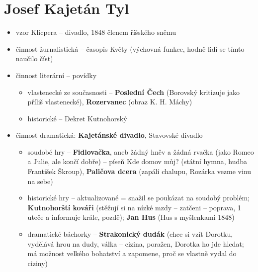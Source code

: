 \documentclass{article}
\begin{document}
\section{Josef Kajetán Tyl}
\begin{itemize}
  \item vzor Klicpera -- divadlo, 1848 členem říšského sněmu
  \item činnost žurnalistická -- časopis Květy (výchovná funkce, hodně lidí se tímto naučilo číst)
  \item činnost literární -- povídky
  \begin{itemize}
    \item vlastenecké ze současnosti -- \textbf{Poslední Čech} (Borovský kritizuje jako příliš vlastenecké), \textbf{Rozervanec} (obraz K. H. Máchy)
    \item historické -- Dekret Kutnohorský
  \end{itemize}
  \item činnost dramatická: \textbf{Kajetánské divadlo}, Stavovské divadlo
  \begin{itemize}
    \item soudobé hry -- \textbf{Fidlovačka}, aneb žádný hněv a žádná rvačka (jako Romeo a Julie, ale končí dobře) -- píseň Kde domov můj? (státní hymna, hudba František Škroup), \textbf{Paličova dcera} (zapálí chalupu, Rozárka vezme vinu na sebe)
    \item historické hry -- aktualizované = snažil se poukázat na soudobý problém; \textbf{Kutnohorští kováři} (stěžují si na nízké mzdy -- zatčeni -- poprava, 1 uteče a informuje krále, pozdě); \textbf{Jan Hus} (Hus s myšlenkami 1848)
    \item dramatické báchorky -- \textbf{Strakonický dudák} (chce si vzít Dorotku, vydělává hrou na dudy, válka -- cizina, poražen, Dorotka ho jde hledat; má možnost velkého bohatství a zapomene, proč se vlastně vydal do ciziny)
  \end{itemize}
\end{itemize}
\end{document}
